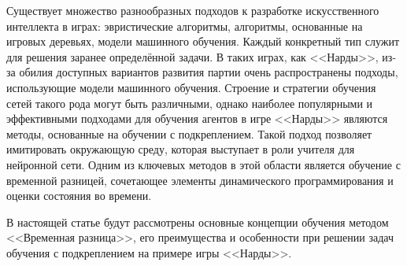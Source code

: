 Существует множество разнообразных подходов к разработке искусственного интеллекта в играх: эвристические алгоритмы, алгоритмы, основанные на игровых деревьях, модели машинного обучения. Каждый конкретный тип служит для решения заранее определённой задачи. В таких играх, как <<Нарды>>, из-за обилия доступных вариантов развития партии очень распространены подходы, использующие модели машинного обучения. Строение и стратегии обучения сетей такого рода могут быть различными, однако наиболее популярными и эффективными подходами для обучения агентов в игре <<Нарды>> являются методы, основанные на обучении с подкреплением. Такой подход позволяет имитировать окружающую среду, которая выступает в роли учителя для нейронной сети. Одним из ключевых методов в этой области является обучение с временной разницей, сочетающее элементы динамического программирования и оценки состояния во времени.

В настоящей статье будут рассмотрены основные концепции обучения методом <<Временная разница>>, его преимущества и особенности при решении задач обучения с подкреплением на примере игры <<Нарды>>.
